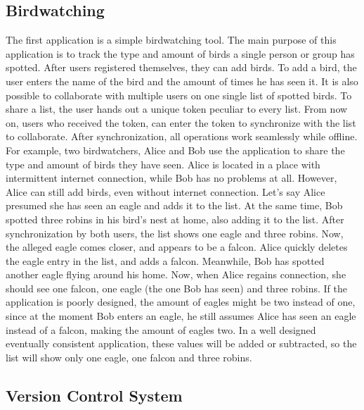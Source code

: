 \documentclass[a4paper,12pt]{report}
\begin{document}
\subsection{Birdwatching}\label{subsec:Birdwatching}

The first application is a simple birdwatching tool. The main purpose of this application is to track the type and amount of birds a single person or group has spotted. After users registered themselves, they can add birds. To add a bird, the user enters the name of the bird and the amount of times he has seen it. It is also possible to collaborate with multiple users on one single list of spotted birds. To share a list, the user hands out a unique token peculiar to every list. From now on, users who received the token, can enter the token to synchronize with the list to collaborate. After synchronization, all operations work seamlessly while offline. For example, two birdwatchers, Alice and Bob use the application to share the type and amount of birds they have seen. Alice is located in a place with intermittent internet connection, while Bob has no problems at all. However, Alice can still add birds, even without internet connection. Let's say Alice presumed she has seen an eagle and adds it to the list. At the same time, Bob spotted three robins in his bird's nest at home, also adding it to the list. After synchronization by both users, the list shows one eagle and three robins. Now, the alleged eagle comes closer, and appears to be a falcon. Alice quickly deletes the eagle entry in the list, and adds a falcon. Meanwhile, Bob has spotted another eagle flying around his home. Now, when Alice regains connection, she should see one falcon, one eagle (the one Bob has seen) and three robins. If the application is poorly designed, the amount of eagles might be two instead of one, since at the moment Bob enters an eagle, he still assumes Alice has seen an eagle instead of a falcon, making the amount of eagles two. In a well designed eventually consistent application, these values will be added or subtracted, so the list will show only one eagle, one falcon and three robins.

\subsection{Version Control System}\label{subsec:VCS}
\end{document}
